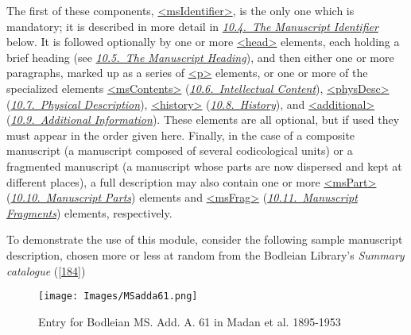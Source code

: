 The first of these components, \hyperref[TEI.msIdentifier]{<msIdentifier>}, is the only one which is mandatory; it is described in more detail in \textit{\hyperref[msid]{10.4.\ The Manuscript Identifier}} below. It is followed optionally by one or more \hyperref[TEI.head]{<head>} elements, each holding a brief heading (see \textit{\hyperref[msdo]{10.5.\ The Manuscript Heading}}), and then either one or more paragraphs, marked up as a series of \hyperref[TEI.p]{<p>} elements, or one or more of the specialized elements \hyperref[TEI.msContents]{<msContents>} (\textit{\hyperref[msco]{10.6.\ Intellectual Content}}), \hyperref[TEI.physDesc]{<physDesc>} (\textit{\hyperref[msph]{10.7.\ Physical Description}}), \hyperref[TEI.history]{<history>} (\textit{\hyperref[mshy]{10.8.\ History}}), and \hyperref[TEI.additional]{<additional>} (\textit{\hyperref[msad]{10.9.\ Additional Information}}). These elements are all optional, but if used they must appear in the order given here. Finally, in the case of a composite manuscript (a manuscript composed of several codicological units) or a fragmented manuscript (a manuscript whose parts are now dispersed and kept at different places), a full description may also contain one or more \hyperref[TEI.msPart]{<msPart>} (\textit{\hyperref[mspt]{10.10.\ Manuscript Parts}}) elements and \hyperref[TEI.msFrag]{<msFrag>} (\textit{\hyperref[msfg]{10.11.\ Manuscript Fragments}}) elements, respectively.\par
To demonstrate the use of this module, consider the following sample manuscript description, chosen more or less at random from the Bodleian Library's \textit{Summary catalogue} (\hyperref[MS-eg-001]{[184]}) \begin{figure}[htbp]
\noindent\noindent\texttt{[image: Images/MSadda61.png]}
\caption{Entry for Bodleian MS. Add. A. 61 in Madan et al. 1895-1953}\end{figure}
\par
